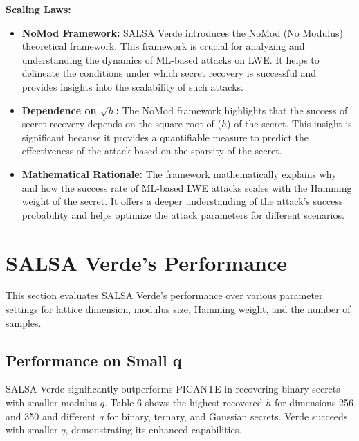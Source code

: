 \documentclass{article}
\begin{document}
\textbf{Scaling Laws:}
\begin{itemize}
    \item \textbf{NoMod Framework:} SALSA Verde introduces the NoMod (No Modulus) theoretical framework. This framework is crucial for analyzing and understanding the dynamics of ML-based attacks on LWE. It helps to delineate the conditions under which secret recovery is successful and provides insights into the scalability of such attacks.
    \item \textbf{Dependence on \(\sqrt{h}\):} The NoMod framework highlights that the success of secret recovery depends on the square root of (\(h\)) of the secret. This insight is significant because it provides a quantifiable measure to predict the effectiveness of the attack based on the sparsity of the secret.
    \item \textbf{Mathematical Rationale:} The framework mathematically explains why and how the success rate of ML-based LWE attacks scales with the Hamming weight of the secret. It offers a deeper understanding of the attack's success probability and helps optimize the attack parameters for different scenarios.
\end{itemize}

\section{SALSA Verde's Performance}

This section evaluates SALSA Verde's performance over various parameter settings for lattice dimension, modulus size, Hamming weight, and the number of samples. 

\subsection*{Performance on Small q}

SALSA Verde significantly outperforms PICANTE in recovering binary secrets with smaller modulus \( q \). Table 6 shows the highest recovered \( h \) for dimensions 256 and 350 and different \( q \) for binary, ternary, and Gaussian secrets. Verde succeeds with smaller \( q \), demonstrating its enhanced capabilities.
\end{document}
